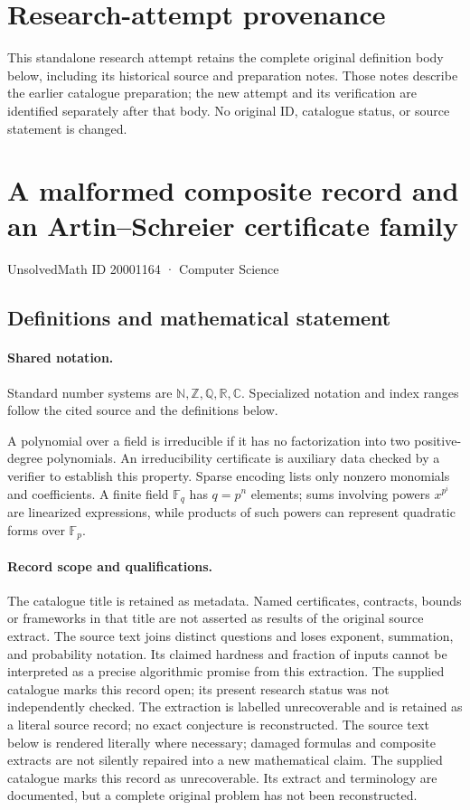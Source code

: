 \documentclass[11pt]{article}
\begin{document}
\section*{Research-attempt provenance}
This standalone research attempt retains the complete original definition body below,
including its historical source and preparation notes. Those notes describe the
earlier catalogue preparation; the new attempt and its verification are identified
separately after that body. No original ID, catalogue status, or source statement is changed.

\section{A malformed composite record and an Artin--Schreier certificate family}\label{20001164}
{\small UnsolvedMath ID 20001164 · Computer Science}
\subsection{Definitions and mathematical statement}

\paragraph{Shared notation.}Standard number systems are $\mathbb N,\mathbb Z,\mathbb Q,\mathbb R,\mathbb C$. Specialized notation and index ranges follow the cited source and the definitions below.


A polynomial over a field is irreducible if it has no factorization into two positive-degree polynomials. An irreducibility certificate is auxiliary data checked by a verifier to establish this property. Sparse encoding lists only nonzero monomials and coefficients. A finite field $\mathbb F_q$ has $q=p^n$ elements; sums involving powers $x^{p^i}$ are linearized expressions, while products of such powers can represent quadratic forms over $\mathbb F_p$.
\paragraph{Record scope and qualifications.}
The catalogue title is retained as metadata. Named certificates, contracts, bounds or frameworks in that title are not asserted as results of the original source extract.
The source text joins distinct questions and loses exponent, summation, and probability notation. Its claimed hardness and fraction of inputs cannot be interpreted as a precise algorithmic promise from this extraction. The supplied catalogue marks this record open; its present research status was not independently checked. The extraction is labelled unrecoverable and is retained as a literal source record; no exact conjecture is reconstructed.
The source text below is rendered literally where necessary; damaged formulas and composite extracts are not silently repaired into a new mathematical claim.
The supplied catalogue marks this record as unrecoverable. Its extract and terminology are documented, but a complete original problem has not been reconstructed.
\end{document}
